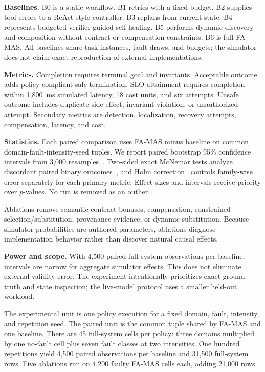 \documentclass[10pt,journal,compsoc]{IEEEtran}
\newcommand{\famas}{FA-MAS}
\begin{document}
\textbf{Baselines.} B0 is a static workflow. B1 retries with a fixed budget. B2 supplies tool errors to a ReAct-style controller. B3 replans from current state. B4 represents budgeted verifier-guided self-healing. B5 performs dynamic discovery and composition without contract or compensation constraints. B6 is full \famas{}. All baselines share task instances, fault draws, and budgets; the simulator does not claim exact reproduction of external implementations.

\textbf{Metrics.} Completion requires terminal goal and invariants. Acceptable outcome adds policy-compliant safe termination. SLO attainment requires completion within 1,800~ms simulated latency, 18 cost units, and six attempts. Unsafe outcome includes duplicate side effect, invariant violation, or unauthorized attempt. Secondary metrics are detection, localization, recovery attempts, compensation, latency, and cost.

\textbf{Statistics.} Each paired comparison uses \famas{} minus baseline on common domain-fault-intensity-seed tuples. We report paired bootstrap 95\% confidence intervals from 3,000 resamples~\cite{efron1993bootstrap}. Two-sided exact McNemar tests analyze discordant paired binary outcomes~\cite{mcnemar1947}, and Holm correction~\cite{holm1979} controls family-wise error separately for each primary metric. Effect sizes and intervals receive priority over $p$-values. No run is removed as an outlier.

Ablations remove semantic-contract bonuses, compensation, constrained selection/substitution, provenance evidence, or dynamic substitution. Because simulator probabilities are authored parameters, ablations diagnose implementation behavior rather than discover natural causal effects.

\textbf{Power and scope.} With 4,500 paired full-system observations per baseline, intervals are narrow for aggregate simulator effects. This does not eliminate external-validity error. The experiment intentionally prioritizes exact ground truth and state inspection; the live-model protocol uses a smaller held-out workload.

The experimental unit is one policy execution for a fixed domain, fault, intensity, and repetition seed. The paired unit is the common tuple shared by \famas{} and one baseline. There are 45 full-system cells per policy: three domains multiplied by one no-fault cell plus seven fault classes at two intensities. One hundred repetitions yield 4,500 paired observations per baseline and 31,500 full-system rows. Five ablations run on 4,200 faulty \famas{} cells each, adding 21,000 rows.
\end{document}
